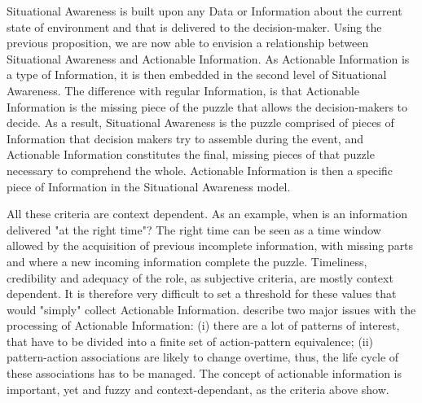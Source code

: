 Situational Awareness is built upon any Data or Information about the current state of environment and that is delivered to the decision-maker.
Using the previous proposition, we are now able to envision a relationship between Situational Awareness and Actionable Information.
As Actionable Information is a type of Information, it is then embedded in the second level of Situational Awareness.
The difference with regular Information, is that Actionable Information is the missing piece of the puzzle that allows the decision-makers to decide.
As a result, Situational Awareness is the puzzle comprised of pieces of Information that
decision makers try to assemble during the event, and Actionable Information constitutes
the final, missing pieces of that puzzle necessary to comprehend the whole.
Actionable Information is then a specific piece of Information in the Situational Awareness model.

All these criteria are context dependent.
As an example, when is an information delivered "at the right time"?
The right time can be seen as a time window allowed by the acquisition of previous incomplete
information, with missing parts and where a new incoming information complete the puzzle.
Timeliness, credibility and adequacy of the role, as subjective criteria, are mostly context dependent.
It is therefore very difficult to set a threshold for these values that would "simply" collect Actionable Information.
\textcite{silberschatzWhatMakesPatterns1996} describe two major issues with the processing of Actionable Information:
(i) there are a lot of patterns of interest, that have to be divided into a finite set of action-pattern equivalence;
(ii) pattern-action associations are likely to change overtime, thus, the life cycle of these associations has to be managed.
The concept of actionable information is important, yet and fuzzy and context-dependant, as the criteria above show.

